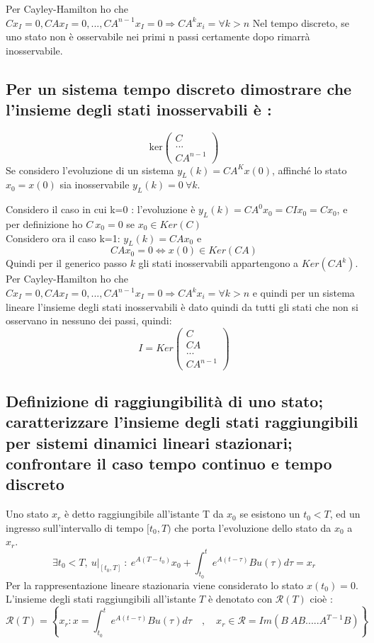 \documentclass{article}
\begin{document}
Per Cayley-Hamilton ho che $Cx_I=0,CAx_I=0,...,CA^{n-1}x_I=0 \Longrightarrow CA^kx_i = \forall k>n$
Nel tempo discreto, se uno stato non è osservabile nei primi n passi certamente dopo rimarrà inosservabile.


\subsection{Per un sistema tempo discreto dimostrare che l'insieme degli stati inosservabili è :}
\[ \text{ker}\begin{pmatrix}C\\...\\CA^{n-1}\end{pmatrix}\]
Se considero l'evoluzione di un sistema $y_L(k)=CA^Kx(0)$, affinché lo stato $x_0 = x(0)$
sia inosservabile $y_L(k)=0\ \forall k$.

Considero il caso in cui k=0 :
l'evoluzione è  $y_L(k)=CA^0x_0=CIx_0=Cx_0$, e per definizione ho $C\ x_0=0$ se $x_0 \in Ker(C)$\\
Considero ora il caso k=1: $y_L(k)=CAx_0$ e 
\[
     CAx_0=0 \Longleftrightarrow x(0) \in Ker(CA)
\]
Quindi per il generico passo $k$ gli stati inosservabili appartengono a $Ker(CA^{k})$.
Per Cayley-Hamilton ho che $Cx_I=0,CAx_I=0,...,CA^{n-1}x_I=0 \Longrightarrow CA^kx_i = \forall k>n$ e quindi 
per un sistema lineare l'insieme degli stati inosservabili è dato quindi da tutti gli stati
che non si osservano in nessuno dei passi, quindi: 
\[
    I=Ker \begin{pmatrix}C\\CA\\...\\CA^{n-1}\end{pmatrix}
\]


\subsection{Definizione di raggiungibilità di uno stato; caratterizzare l'insieme degli stati raggiungibili per sistemi dinamici lineari stazionari; confrontare il caso tempo continuo e tempo discreto}
Uno stato $x_r$ è detto raggiungibile all'istante T da $x_0$ se esistono un $t_0<T$, ed un ingresso sull'intervallo di tempo $[t_0,T)$
che porta l'evoluzione dello stato da $x_0$ a $x_r$.
\[ \exists t_0 < T,\ \left.u\right|_{[t_0,T]}\ :\ e^{A(T-t_0)}x_0+ \int_{t_0}^{t} e^{A(t-\tau)}Bu(\tau) d\tau = x_r \]
Per la rappresentazione lineare stazionaria viene considerato lo stato $x(t_0)=0$. 
L'insieme degli stati raggiungibili all'istante $T$ è denotato con $\mathcal{R}(T)$ cioè :
\[\mathcal{R}(T)=\left\{ x_r : x= \int_{t_0}^{t} e^{A(t-\tau)}Bu(\tau)d\tau
\quad, \quad
x_r \in \mathcal{R}=Im(B\ AB ..... A^{T-1}B) \right\} \]
\end{document}
